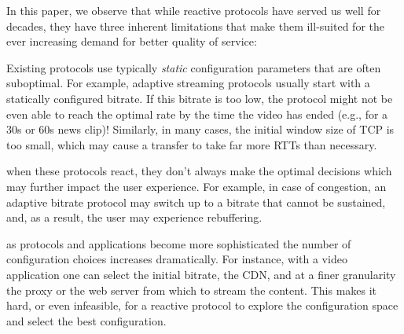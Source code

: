In this paper, we observe that while reactive protocols have served us well for decades, 
they have three inherent limitations that make them ill-suited for the ever increasing demand for better quality of service: 

 Existing protocols use typically \emph{static} configuration parameters that are often suboptimal. For example, adaptive streaming protocols usually start with a statically configured bitrate. If this bitrate is too low, the protocol might not be even able to reach the optimal rate by the time the video has ended (e.g., for a 30s or 60s news clip)! Similarly, in many cases, the initial window size of TCP is too small, which may cause a transfer to take far more RTTs than necessary. 

 when these protocols react, they don't always make the optimal decisions which may further impact the user experience. For example, in case of congestion, an adaptive bitrate protocol may switch up to a bitrate that cannot be sustained, and, as a result, the user may experience rebuffering.

 as protocols and applications become more sophisticated the number of configuration choices increases dramatically. For instance, with a video application one can select the initial bitrate, the CDN, and at a finer granularity the proxy or the web server from which to stream the content. This makes it hard, or even infeasible, for a reactive protocol to explore the configuration space and select the best configuration.



